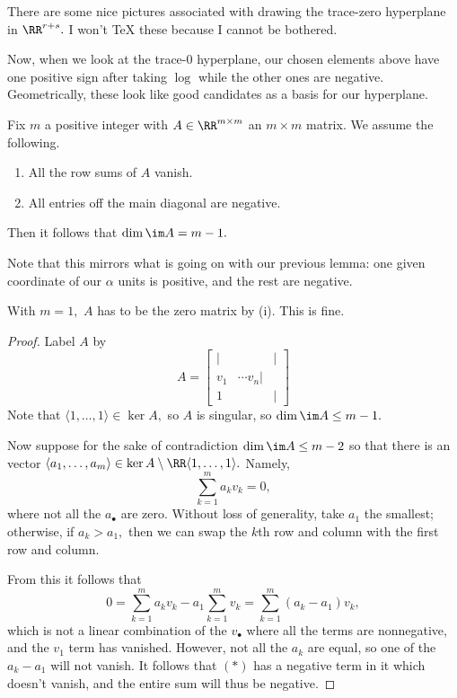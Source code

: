 \documentclass[../notes.tex]{subfiles}
\begin{document}
\begin{remark}
    There are some nice pictures associated with drawing the trace-zero hyperplane in $\RR^{r+s}.$ I won't TeX these because I cannot be bothered.
\end{remark}
Now, when we look at the trace-$0$ hyperplane, our chosen elements above have one positive sign after taking $\log$ while the other ones are negative. Geometrically, these look like good candidates as a basis for our hyperplane.
\begin{lemma} \label{lem:matrixrank}
    Fix $m$ a positive integer with $A\in\RR^{m\times m}$ an $m\times m$ matrix. We assume the following.
    \begin{enumerate}[label=(\roman*)]
        \item All the row sums of $A$ vanish.
        \item All entries off the main diagonal are negative.
    \end{enumerate}
    Then it follows that $\dim\im A=m-1.$
\end{lemma}
Note that this mirrors what is going on with our previous lemma: one given coordinate of our $\alpha$ units is positive, and the rest are negative.
\begin{example}
    With $m=1,$ $A$ has to be the zero matrix by (i). This is fine.
\end{example}
\begin{proof}
    Label $A$ by
    \[A=\begin{bmatrix}
        | & & | \\
        v_1 & \cdots v_n | \\
        1 & & |
    \end{bmatrix}\]
    Note that $\langle1,\ldots,1\rangle\in\ker A,$ so $A$ is singular, so $\dim\im A\le m-1.$

    Now suppose for the sake of contradiction $\dim\im A\le m-2$ so that there is an vector $\langle a_1,\ldots,a_m\rangle\in\ker A\setminus\RR\langle1,\ldots,1\rangle.$ Namely,
    \[\sum_{k=1}^ma_kv_k=0,\]
    where not all the $a_\bullet$ are zero. Without loss of generality, take $a_1$ the smallest; otherwise, if $a_k>a_1,$ then we can swap the $k$th row and column with the first row and column.

    From this it follows that
    \[0=\sum_{k=1}^ma_kv_k-a_1\sum_{k=1}^mv_k=\sum_{k=1}^m(a_k-a_1)v_k,\tag{$*$}\]
    which is not a linear combination of the $v_\bullet$ where all the terms are nonnegative, and the $v_1$ term has vanished. However, not all the $a_k$ are equal, so one of the $a_k-a_1$ will not vanish. It follows that $(*)$ has a negative term in it which doesn't vanish, and the entire sum will thus be negative.
\end{proof}
\end{document}
